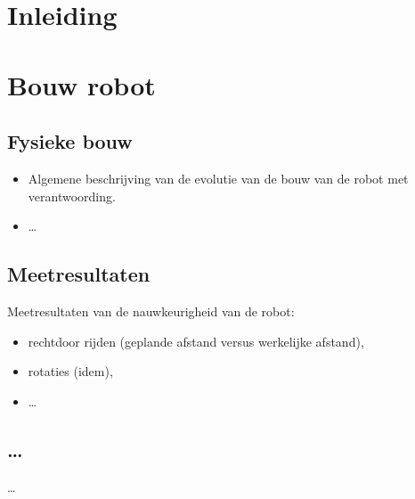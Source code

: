\documentclass[tt2]{penoverslag}
\begin{document}

\maketitlepage

\begin{abstract}
\lipsum[1-2]
\end{abstract}

\tableofcontents

\newpage

\section{Inleiding}
\lipsum[1-2]

\section{Bouw robot}
\lipsum[3]

\subsection{Fysieke bouw}
\begin{itemize}
\item Algemene beschrijving van de evolutie van de bouw van de robot met verantwoording.
\item \ldots
\end{itemize}

\subsection{Meetresultaten}
Meetresultaten van de nauwkeurigheid van de robot:
\begin{itemize}
\item rechtdoor rijden (geplande afstand versus werkelijke afstand),
\item rotaties (idem),
\item \ldots
\end{itemize}

\subsection{\ldots}
\ldots
\end{document}
